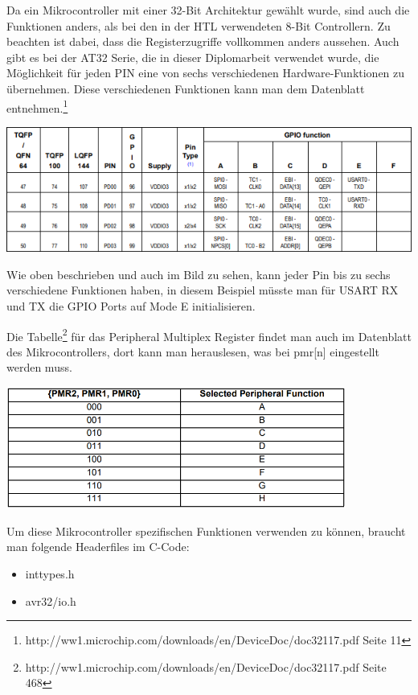 \documentclass[paper=a4, 12pt]{scrreprt}
\begin{document}
	Da ein Mikrocontroller mit einer 32-Bit Architektur gewählt wurde, sind auch die Funktionen anders, als bei den in der HTL verwendeten 8-Bit Controllern. Zu beachten ist dabei, dass die Registerzugriffe vollkommen anders aussehen. Auch gibt es bei der AT32 Serie, die in dieser Diplomarbeit verwendet wurde, die Möglichkeit für jeden PIN eine von sechs verschiedenen Hardware-Funktionen zu übernehmen. Diese verschiedenen Funktionen kann man dem Datenblatt entnehmen.\footnote{http://ww1.microchip.com/downloads/en/DeviceDoc/doc32117.pdf Seite 11}
	\begin{adjustbox}{center,caption={Ausschnitt aus der Peripheral Multiplexing Tabelle},label={fig:PeripheralMultiplexRegisterTabelle.PNG},nofloat=figure,vspace=\bigskipamount}
		\includegraphics[width=\textwidth]{img/Peripheral_Multiplex_Register_Tabelle.PNG}
	\end{adjustbox}
	Wie oben beschrieben und auch im Bild zu sehen, kann jeder Pin bis zu sechs verschiedene Funktionen haben, in diesem Beispiel müsste man für USART RX und TX die GPIO Ports auf Mode E initialisieren.
	
	
	Die Tabelle\footnote{http://ww1.microchip.com/downloads/en/DeviceDoc/doc32117.pdf Seite 468} für das Peripheral Multiplex Register findet man auch im Datenblatt des Mikrocontrollers, dort kann man herauslesen, was bei pmr[n] eingestellt werden muss.
	\begin{adjustbox}{center,caption={Peripheral Multiplex Register Mode Tabelle},label={fig:PeripheralFunktions.PNG},nofloat=figure,vspace=\bigskipamount}
		\includegraphics[height=4cm]{img/Peripheral_Funktions.PNG}
	\end{adjustbox}
	Um diese Mikrocontroller spezifischen Funktionen verwenden zu können, braucht man folgende Headerfiles im C-Code:
	\begin{itemize}
		\item inttypes.h
		\item avr32/io.h
	\end{itemize}
\end{document}
